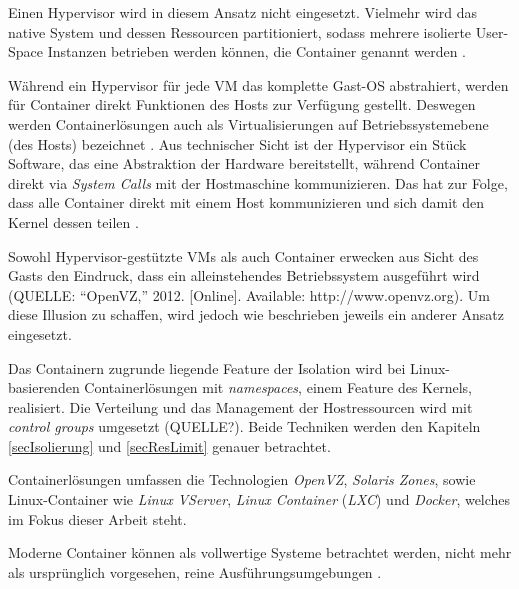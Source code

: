 \documentclass[../main.tex]{subfiles}
\begin{document}
      Einen Hypervisor wird in diesem Ansatz nicht eingesetzt. Vielmehr wird das native System und dessen Ressourcen partitioniert, sodass mehrere isolierte User-Space Instanzen betrieben werden können, die Container genannt werden \cite[S.2]{containerVirtPerformance} .

      Während ein Hypervisor für jede VM das komplette Gast-OS abstrahiert, werden für Container direkt Funktionen des Hosts zur Verfügung gestellt. Deswegen werden Containerlösungen auch als Virtualisierungen auf Betriebssystemebene (des Hosts) bezeichnet \cite[S.6]{dockerBook}\cite[S.2]{containerVirtPerformance}. Aus technischer Sicht ist der Hypervisor ein Stück Software, das eine Abstraktion der Hardware bereitstellt, während Container direkt via \emph{System Calls} mit der Hostmaschine kommunizieren. Das hat zur Folge, dass alle Container direkt mit einem Host kommunizieren und sich damit den Kernel dessen teilen \cite[S.2]{containerVirtPerformance}\cite[S.3]{dockerLXCKub}.

      Sowohl Hypervisor-gestützte VMs als auch Container erwecken aus Sicht des Gasts den Eindruck, dass ein alleinstehendes Betriebssystem ausgeführt wird (QUELLE: “OpenVZ,” 2012. [Online]. Available: http://www.openvz.org). Um diese Illusion zu schaffen, wird jedoch wie beschrieben jeweils ein anderer Ansatz eingesetzt.

      Das Containern zugrunde liegende Feature der Isolation wird bei Linux-basierenden Containerlösungen mit \emph{namespaces}, einem Feature des Kernels, realisiert. Die Verteilung und das Management der Hostressourcen wird mit \emph{control groups} umgesetzt (QUELLE?). Beide Techniken werden den Kapiteln \ref{secIsolierung} und \ref{secResLimit} genauer betrachtet.


      Containerlösungen umfassen die Technologien \emph{OpenVZ}, \emph{Solaris Zones}, sowie Linux-Container wie \emph{Linux VServer}, \emph{Linux Container} (\emph{LXC}) \cite[S.7]{dockerBook}\cite[S.1]{containerVirtPerformance} und \emph{Docker}, welches im Fokus dieser Arbeit steht.

      Moderne Container können als vollwertige Systeme betrachtet werden, nicht mehr als ursprünglich vorgesehen, reine Ausführungsumgebungen \cite[S.7]{dockerBook}.
\end{document}
